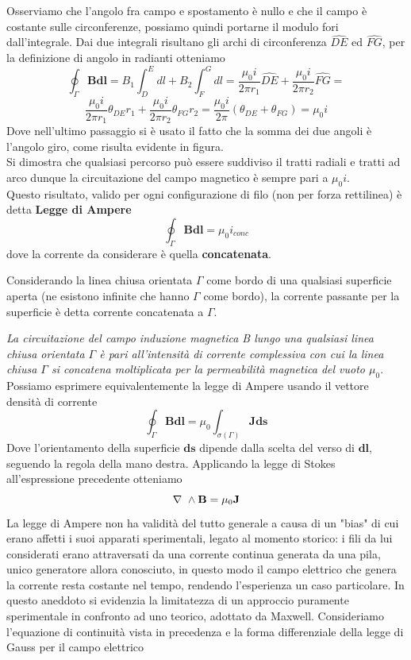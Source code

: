 \documentclass[
10pt, %
a4paper, %
oneside, %
headinclude,footinclude, %
BCOR5mm, %
]{scrartcl}
\begin{document}
Osserviamo che l'angolo fra campo e spostamento è nullo e che il campo è costante sulle circonferenze, possiamo quindi portarne il modulo fori dall'integrale. Dai due integrali risultano gli archi di circonferenza \(\widehat{DE}\) ed \(\widehat{FG}\), per la definizione di angolo in radianti otteniamo
\[\oint_{\Gamma}\mathbf{B}\mathbf{dl}=B_1\int_{D}^{E}dl+B_2\int_{F}^{G}dl= \frac{\mu_0 i}{2\pi r_1}\widehat{DE}+\frac{\mu_0 i}{2\pi r_2}\widehat{FG}=\]
 \[\frac{\mu_0 i}{2\pi r_1}\theta_{DE}r_1+\frac{\mu_0 i}{2\pi r_2}\theta_{FG}r_2=\frac{\mu_0 i}{2\pi}(\theta_{DE}+\theta_{FG})=\mu_0 i \]
Dove nell'ultimo passaggio si è usato il fatto che la somma dei due angoli è l'angolo giro, come risulta evidente in figura.\\
Si dimostra che qualsiasi percorso può essere suddiviso il tratti radiali e tratti ad arco dunque la circuitazione del campo magnetico è sempre pari a \(\mu_0 i\).\\
Questo risultato, valido per ogni configurazione di filo (non per forza rettilinea) è detta \textbf{Legge di Ampere}
\[\oint_{\Gamma}\mathbf{B}\mathbf{dl}=\mu_0 i_{conc}\] 
dove la corrente da considerare è quella \textbf{concatenata}.
\begin{definizione}
	Considerando la linea chiusa orientata $\Gamma$ come bordo di una qualsiasi superficie aperta (ne esistono infinite che hanno $\Gamma$ come bordo), la corrente passante per la superficie è detta corrente concatenata a $\Gamma$.
\end{definizione}
\textit{La circuitazione del campo induzione magnetica B lungo una qualsiasi linea chiusa orientata \(\Gamma\) è pari all'intensità di corrente complessiva con cui la linea chiusa $\Gamma$ si concatena moltiplicata per la permeabilità magnetica del vuoto $\mu_0$}.\\
Possiamo esprimere equivalentemente la legge di Ampere usando il vettore densità di corrente
\[\oint_{\Gamma}\mathbf{B}\mathbf{dl}= \mu_0\int_{\sigma(\Gamma)}\mathbf{J}\mathbf{ds}\]
Dove l'orientamento della superficie $\mathbf{ds}$ dipende dalla scelta del verso di $\mathbf{dl}$, seguendo la regola della mano destra. 
Applicando la legge di Stokes all'espressione precedente otteniamo
\[\mathbf{\nabla\ }\wedge\mathbf{B}=\mu_0\mathbf{J}\]
La legge di Ampere non ha validità del tutto generale a causa di un "bias" di cui erano affetti i suoi apparati sperimentali, legato al momento storico: i fili da lui considerati erano attraversati da una corrente continua generata da una pila, unico generatore allora conosciuto, in questo modo il campo elettrico che genera la corrente resta costante nel tempo, rendendo l'esperienza un caso particolare. In questo aneddoto si evidenzia la limitatezza di un approccio puramente sperimentale in confronto ad uno teorico, adottato da Maxwell. Consideriamo l'equazione di continuità vista in precedenza e la forma differenziale della legge di Gauss per il campo elettrico
\end{document}

